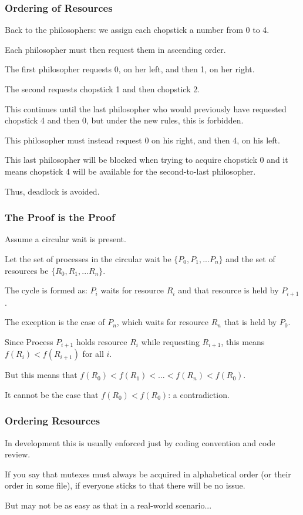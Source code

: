 \begin{frame}
\frametitle{Ordering of Resources}

Back to the philosophers: we assign each chopstick a number from 0 to 4. 

Each philosopher must then request them in ascending order. 

The first philosopher requests 0, on her left, and then 1, on her right. 

The second requests chopstick 1 and then chopstick 2. 

This continues until the last philosopher who would previously have requested chopstick 4 and then 0, but under the new rules, this is forbidden. 

This philosopher must instead request 0 on his right, and then 4, on his left. 

This last philosopher will be blocked when trying to acquire chopstick 0 and it means chopstick 4 will be available for the second-to-last philosopher. 

Thus, deadlock is avoided.

\end{frame}

\begin{frame}
\frametitle{The Proof is the Proof}

Assume a circular wait is present. 

Let the set of processes in the circular wait be $\{P_{0}, P_{1}, ... P_{n}\}$ and the set of resources be $\{R_{0}, R_{1}, ... R_{n}\}$. 

The cycle is formed as: $P_{i}$ waits for resource $R_{i}$ and that resource is held by $P_{i+1}$. 

The exception is the case of $P_{n}$, which waits for resource $R_{n}$ that is held by $P_{0}$.

Since Process $P_{i+1}$ holds resource $R_{i}$ while requesting $R_{i+1}$, this means $f(R_{i}) < f(R_{i+1})$ for all $i$. 

But this means that $f(R_{0}) < f(R_{1}) < ... < f(R_{n}) < f(R_{0})$. 

It cannot be the case that $f(R_{0}) < f(R_{0})$: a contradiction.

\end{frame}

\begin{frame}
\frametitle{Ordering Resources}

In development this is usually enforced just by coding convention and code review. 

If you say that mutexes must always be acquired in alphabetical order (or their order in some file), if everyone sticks to that there will be no issue.

But may not be as easy as that in a real-world scenario...

\end{frame}

